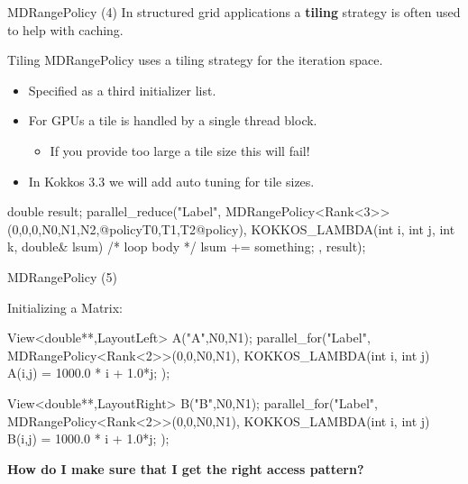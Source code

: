 \begin{frame}[fragile]{MDRangePolicy (4)}
   In structured grid applications a \textbf{tiling} strategy is often used to help with caching.

	\begin{block}{Tiling}
		MDRangePolicy uses a tiling strategy for the iteration space.
	\end{block}

	\begin{itemize}
		\item Specified as a third initializer list.
		\item For GPUs a tile is handled by a single thread block.
			\begin{itemize}
				\item If you provide too large a tile size this will fail!
			\end{itemize}
		\item In Kokkos 3.3 we will add auto tuning for tile sizes. 
	\end{itemize}

\begin{code}[keywords={}]
double result;
parallel_reduce("Label", 
  MDRangePolicy<Rank<3>>({0,0,0},{N0,N1,N2},@policy{T0,T1,T2}@policy), 
  KOKKOS_LAMBDA(int i, int j, int k, double& lsum) {
     /* loop body */
  lsum += something;
}, result);
  \end{code}

\end{frame}


\begin{frame}[fragile]{MDRangePolicy (5)}

  Initializing a Matrix:
  
\begin{code}[keywords={LayoutLeft}]
View<double**,LayoutLeft> A("A",N0,N1);
parallel_for("Label", 
  MDRangePolicy<Rank<2>>({0,0},{N0,N1}), 
  KOKKOS_LAMBDA(int i, int j) {
    A(i,j) = 1000.0 * i + 1.0*j;
});
\end{code}

\begin{code}[keywords={LayoutRight}]
View<double**,LayoutRight> B("B",N0,N1);
parallel_for("Label", 
  MDRangePolicy<Rank<2>>({0,0},{N0,N1}), 
  KOKKOS_LAMBDA(int i, int j) {
    B(i,j) = 1000.0 * i + 1.0*j;
});
\end{code} 

\pause

	\textbf{How do I make sure that I get the right access pattern?}

\end{frame}


